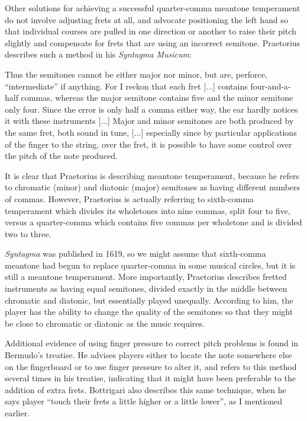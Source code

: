 Other solutions for achieving a successful quarter-comma meantone temperament do not involve
adjusting frets at all, and advocate positioning the left hand so that individual courses are pulled in
one direction or another to raise their pitch slightly and compensate for frets that are using an
incorrect semitone. Praetorius describes such a method in his \textit{Syntagma Musicum}:
\begin{blocks}
Thus the semitones cannot be either major nor minor, but are, perforce, ``intermediate''
if anything. For I reckon that each fret [...] contains four-and-a-half commas, whereas
the major semitone contains five and the minor semitone only four. Since the error is
only half a comma either way, the ear hardly notices it with these instruments [...]
Major and minor semitones are both produced by the same fret, both sound in tune, [...]
especially since by particular applications of the finger to the string, over the fret,
it is possible to have some control over the pitch of the note produced.
\autocite[68]{MP:1}
\end{blocks}
It is clear that Praetorius is describing meantone temperament, because he
refers to chromatic (minor) and diatonic (major) semitones as having different numbers of
commas.  However, Praetorius is actually referring to sixth-comma temperament
which divides its wholetones into nine commas, split four to five, versus a quarter-comma
which contains five commas per wholetone and is divided two to three.

\textit{Syntagma} was published in 1619, so we might assume that sixth-comma
meantone had begun to replace quarter-comma in some musical circles, but it is still a
meantone temperament.  More importantly, Praetorius describes fretted instruments as
having equal semitones, divided exactly in the middle between chromatic and diatonic,
but essentially played unequally.  According to him, the player has the ability to
change the quality of the semitones so that they might be close to chromatic or
diatonic as the music requires.

Additional evidence of using finger pressure to correct pitch problems is found
in Bermudo's treatise. He advises players either to locate the note somewhere
else on the fingerboard or to use finger pressure to alter it, and refers to
this method several times in his treatise, indicating that it might have been
preferable to the addition of extra frets. \autocite[106]{DE:1}  Bottrigari also
describes this same technique, when he says player ``touch their frets a little
higher or a little lower'', as I mentioned earlier. \autocite[15]{HB:1}

